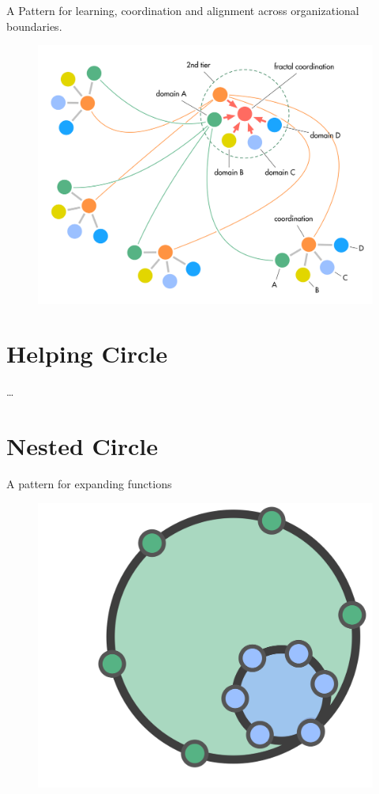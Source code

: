 A Pattern for learning, coordination and alignment across organizational boundaries.

\begin{figure}[htbp]
\centering
\includegraphics[keepaspectratio,width=\textwidth,height=0.75\textheight]{img/structural-patterns/fractal-organization.png}
\end{figure}

\section{Helping Circle}
\label{helpingcircle}

{\ldots}

\section{Nested Circle}
\label{nestedcircle}

A pattern for expanding functions

\begin{figure}[htbp]
\centering
\includegraphics[keepaspectratio,width=\textwidth,height=0.75\textheight]{img/structural-patterns/nested-circle.png}
\end{figure}

